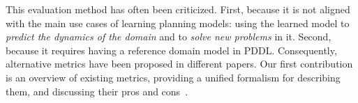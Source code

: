 \documentclass[letterpaper]{article} %
\newif\ifaddcomments
\newcommand{\roni}[1]{\ifaddcomments{\textcolor{red}{[Roni: #1]}}\fi}
\newcommand{\leo}[1]{\ifaddcomments{\textcolor{pink}{[Leonardo: #1]}}\fi}
\begin{document}
\roni{New paragraph}
This evaluation method has often been criticized. 
First, because it is not aligned with the main use cases of learning planning models: using the learned model to 
\emph{predict the dynamics of the domain} and to \emph{solve new problems} in it. 
Second, because it requires having a reference domain model in PDDL. 
Consequently, alternative metrics have been proposed in different papers. Our first contribution is 
an overview of existing metrics, providing a unified formalism for describing them, and discussing their pros and cons~\citep{garrido2024challenges,aineto2019learning,juba2021safe,mordoch2024safe,Oswald2024DLLMDomainModeling}. 





\end{document}
